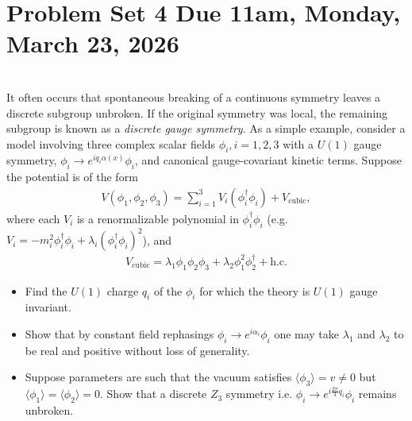 \section*{Problem Set 4 Due 11am, Monday, March 23, 2026}

\\
It often occurs that spontaneous breaking of a continuous symmetry leaves a discrete subgroup unbroken. If the original symmetry was local, the remaining subgroup is known as a \textit{discrete gauge symmetry}. As a simple example, consider a model involving three complex scalar fields $\phi_i,i=1,2,3$ with a $U(1)$ gauge symmetry, $\phi_i\to e^{iq_i\alpha(x)} \phi_i$, and canonical gauge-covariant kinetic terms. Suppose the potential is of the form
\begin{align}
    V(\phi_1,\phi_2,\phi_3) =\sum_{i=1}^3V_i (\phi_i^\dagger \phi_i) +V_{\text{cubic}},
\end{align}
where each $V_i$ is a renormalizable polynomial in $\phi_i^\dagger \phi_i$ (e.g. $V_i =-m_i^2 \phi_i^\dagger \phi_i +\lambda_i (\phi_i^\dagger \phi_i)^2$), and 
\begin{align}
    V_{\text{cubic}} = \lambda_1 \phi_1 \phi_2 \phi_3 +\lambda_2 \phi_1^2 \phi_2^\dagger +\text{h.c.}
\end{align}

\begin{itemize}
    \item [(a)]Find the $U(1)$ charge $q_i$ of the $\phi_i$ for which the theory is $U(1)$ gauge invariant.
    \item [(b)] Show that by constant field rephasings $\phi_i\to e^{i\alpha_i} \phi_i$ one may take $\lambda_1$ and $\lambda_2$ to be real and positive without loss of generality.
    \item [(c)] Suppose parameters are such that the vacuum satisfies $\langle \phi_3\rangle =v\neq 0$ but $\langle \phi_1\rangle =\langle \phi_2\rangle =0$. Show that a discrete ${Z}_3$ symmetry i.e. $\phi_i\to e^{i\frac{2\pi}{3}q_i} \phi_i$ remains unbroken.
\end{itemize}


